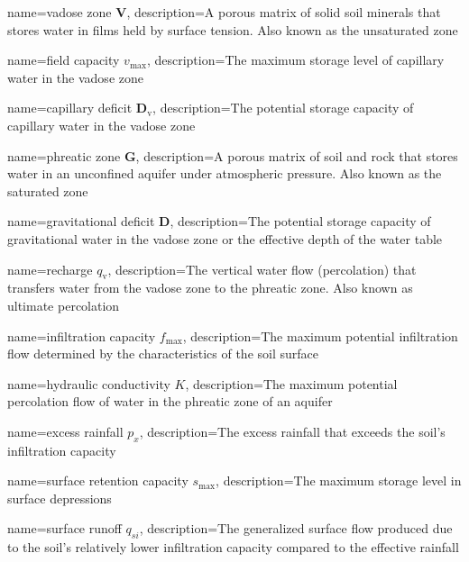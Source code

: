 {
    name=vadose zone $\textbf{V}$,
    description={A porous matrix of solid soil minerals that stores water in films held by surface tension. Also known as the unsaturated zone}
}

{
    name=field capacity $v_{\text{max}}$,
    description={The maximum storage level of capillary water in the vadose zone}
}

{
    name=capillary deficit $\textbf{D}_\text{v}$,
    description={The potential storage capacity of capillary water in the vadose zone}
}

{
    name=phreatic zone $\textbf{G}$,
    description={A porous matrix of soil and rock that stores water in an unconfined aquifer under atmospheric pressure. Also known as the saturated zone}
}

{
    name=gravitational deficit $\textbf{D}$,
    description={The potential storage capacity of gravitational water in the vadose zone or the effective depth of the water table}
}

{
    name=recharge $q_{\text{v}}$,
    description={The vertical water flow (percolation) that transfers water from the vadose zone to the phreatic zone. Also known as ultimate percolation}
}

{
    name=infiltration capacity $f_{\text{max}}$,
    description={The maximum potential infiltration flow determined by the characteristics of the soil surface}
}

{
    name=hydraulic conductivity $K$,
    description={The maximum potential percolation flow of water in the phreatic zone of an aquifer}
}

{
    name=excess rainfall $p_{x}$,
    description={The excess rainfall that exceeds the soil's infiltration capacity}
}

{
    name=surface retention capacity $s_{\text{max}}$,
    description={The maximum storage level in surface depressions}
}

{
    name=surface runoff $q_{si}$,
    description={The generalized surface flow produced due to the soil's relatively lower infiltration capacity compared to the effective rainfall}
}

